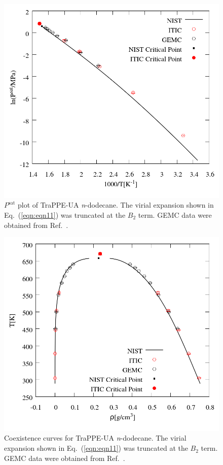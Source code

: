 \documentclass[%
 aip,
 jcp,
 sd,%
 amsmath,amssymb,
 reprint,%
]{revtex4-1}
\begin{document}
\begin{figure}
\includegraphics[scale=0.30]{Figures/EXAMPLE-SIM_TraPPE-C12_psat.png}
\caption{$P^{\mathrm{sat}}$ plot of TraPPE-UA \textit{n}-dodecane. The virial expansion shown in Eq.~(\ref{eqn:eqn11}) was truncated at the $B_2$ term. GEMC data were obtained from Ref.~.}
\label{fig:EXAMPLE-SIM/TraPPE-C12/Psat}
\end{figure}

\begin{figure}
\includegraphics[scale=0.30]{Figures/EXAMPLE-SIM_TraPPE-C12_trho.png}
\caption{Coexistence curves for TraPPE-UA \textit{n}-dodecane. The virial expansion shown in Eq.~(\ref{eqn:eqn11}) was truncated at the $B_2$ term. GEMC data were obtained from Ref.~.}
\label{fig:EXAMPLE-SIM/TraPPE-C12/T_rho}
\end{figure}
\end{document}
